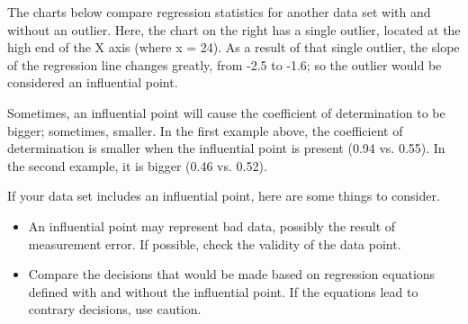 \documentclass[residuals.tex]{subfiles}
\begin{document}
The charts below compare regression statistics for another data set with and without an outlier. Here, the chart on the right has a single outlier, located at the high end of the X axis (where x = 24). As a result of that single outlier, the slope of the regression line changes greatly, from -2.5 to -1.6; so the outlier would be considered an influential point.





Sometimes, an influential point will cause the coefficient of determination to be bigger; sometimes, smaller. In the first example above, the coefficient of determination is smaller when the influential point is present (0.94 vs. 0.55). In the second example, it is bigger (0.46 vs. 0.52).

If your data set includes an influential point, here are some things to consider.


\begin{itemize}
\item An influential point may represent bad data, possibly the result of measurement error. If possible, check the validity of the data point.

\item Compare the decisions that would be made based on regression equations defined with and without the influential point. If the equations lead to contrary decisions, use caution.

\end{itemize}
%
%
%
%
%
\end{document}
